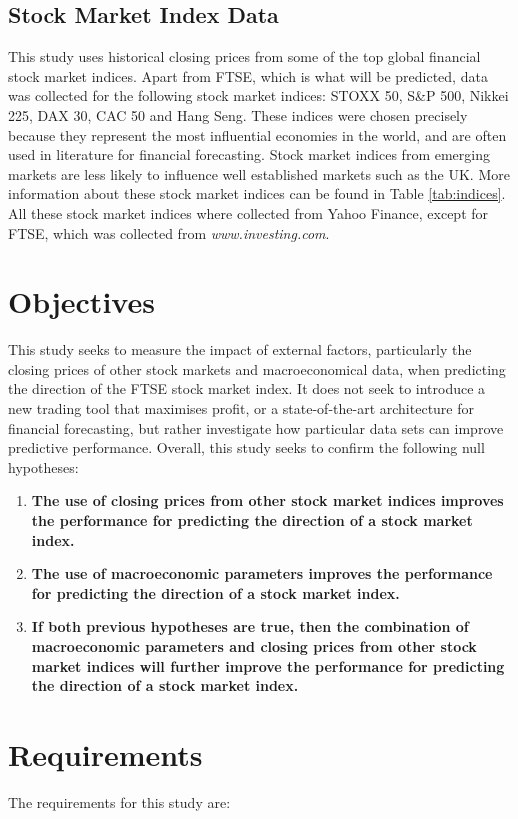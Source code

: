 \documentclass{UoYCSproject}
\begin{document}
\subsection{Stock Market Index Data}
This study uses historical closing prices from some of the top global financial stock market indices. Apart from FTSE, which is what will be predicted, data was collected for the following stock market indices: STOXX 50, S\&P 500, Nikkei 225, DAX 30, CAC 50 and Hang Seng. These indices were chosen precisely because they represent the most influential economies in the world, and are often used in literature for financial forecasting. Stock market indices from emerging markets are less likely to influence well established markets such as the UK.  More information about these stock market indices can be found in Table \ref{tab:indices}. All these stock market indices where collected from Yahoo Finance, except for FTSE, which was collected from \textit{www.investing.com}. 

\section{Objectives}
\label{sec:objectives}
This study seeks to measure the impact of external factors, particularly the closing prices of other stock markets and macroeconomical data, when predicting the direction of the FTSE stock market index. It does not seek to introduce a new trading tool that maximises profit, or a state-of-the-art architecture for financial forecasting, but rather investigate how particular data sets can improve predictive performance. Overall, this study seeks to confirm the following null hypotheses:

\begin{enumerate}
    \item \label{h1} \textbf{The use of closing prices from other stock market indices improves the performance for predicting the direction of a stock market index.}
    \item \label{h2} \textbf{The use of macroeconomic parameters improves the performance for predicting the direction of a stock market index.}
    \item \label{h3} \textbf{If both previous hypotheses are true, then the combination of macroeconomic parameters and closing prices from other stock market indices will further improve the performance for predicting the direction of a stock market index.}
\end{enumerate}

\section{Requirements}
\label{sec:requirements}
The requirements for this study are:
\end{document}

